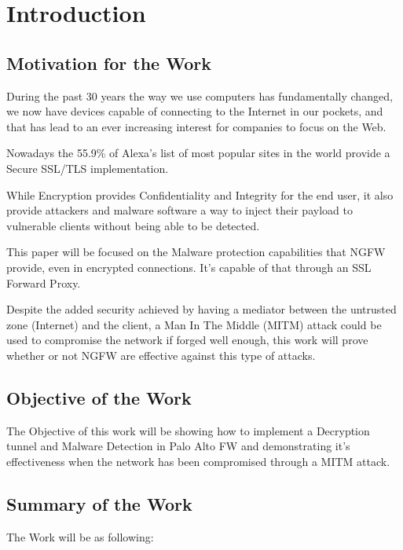 \chapter{Introduction}
\section{Motivation for the Work}

During the past 30 years the way we use computers has fundamentally changed, we now have devices capable of connecting to the Internet in our pockets, and that has lead to an ever increasing interest for companies to focus on the Web.

Nowadays the 55.9\% of Alexa's list of most popular sites in the world provide a Secure SSL/TLS implementation\cite{ssl-pulse}.

While Encryption provides Confidentiality and Integrity\cite{ibm-ssl} for the end user, it also provide attackers and malware software a way to inject their payload to vulnerable clients without being able to be detected.

This paper will be focused on the Malware protection capabilities that NGFW provide, even in encrypted connections. It's capable of that through an SSL Forward Proxy.

Despite the added security achieved by having a mediator between the untrusted zone (Internet) and the client, a Man In The Middle (MITM) attack could be used to compromise the network if forged well enough, this work will prove whether or not NGFW are effective against this type of attacks.


\section{Objective of the Work}

The Objective of this work will be showing how to implement a Decryption tunnel and Malware Detection in Palo Alto FW and demonstrating it's effectiveness when the network has been compromised through a MITM attack.


\section{Summary of the Work}

The Work will be as following:

